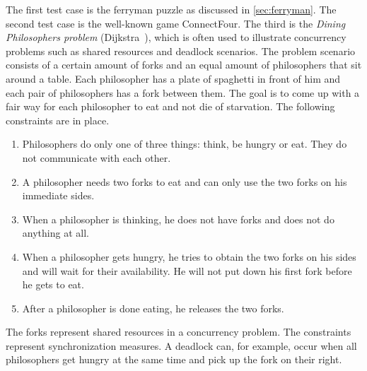 \par The first test case is the ferryman puzzle as discussed in \cref{sec:ferryman}. The second test case is the well-known game ConnectFour. The third is the \emph{Dining Philosophers problem} (Dijkstra~\cite{dijkstra1968}), which is often used to illustrate concurrency problems such as shared resources and deadlock scenarios. The problem scenario consists of a certain amount of forks and an equal amount of philosophers that sit around a table. Each philosopher has a plate of spaghetti in front of him and each pair of philosophers has a fork between them. The goal is to come up with a fair way for each philosopher to eat and not die of starvation. The following constraints are in place.
\begin{enumerate}
\item Philosophers do only one of three things: think, be hungry or eat. They do not communicate with each other.
\item A philosopher needs two forks to eat and can only use the two forks on his immediate sides.
\item When a philosopher is thinking, he does not have forks and does not do anything at all.
\item When a philosopher gets hungry, he tries to obtain the two forks on his sides and will wait for their availability. He will not put down his first fork before he gets to eat.
\item After a philosopher is done eating, he releases the two forks.
\end{enumerate}
The forks represent shared resources in a concurrency problem. The constraints represent synchronization measures. A deadlock can, for example, occur when all philosophers get hungry at the same time and pick up the fork on their right.